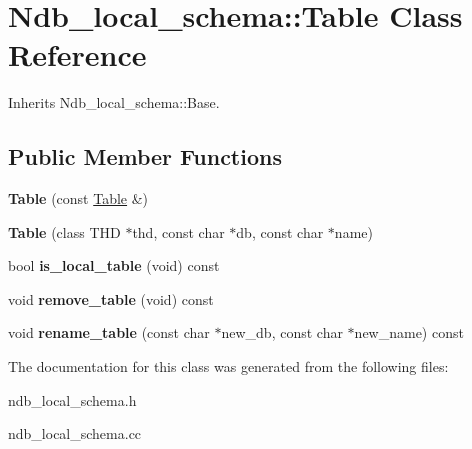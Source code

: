 \hypertarget{classNdb__local__schema_1_1Table}{}\section{Ndb\+\_\+local\+\_\+schema\+:\+:Table Class Reference}
\label{classNdb__local__schema_1_1Table}


Inherits Ndb\+\_\+local\+\_\+schema\+::\+Base.

\subsection*{Public Member Functions}
\begin{DoxyCompactItemize}
\item 
\mbox{\label{classNdb__local__schema_1_1Table_a57cbb62e132bff60d9290bac4c2e403d}} 
{\bfseries Table} (const \mbox{\hyperlink{classNdb__local__schema_1_1Table}{Table}} \&)
\item 
\mbox{\label{classNdb__local__schema_1_1Table_a57428005c221692c76feb58b849124d6}} 
{\bfseries Table} (class T\+HD $\ast$thd, const char $\ast$db, const char $\ast$name)
\item 
\mbox{\label{classNdb__local__schema_1_1Table_a6a1d059c4c5c9ac07bfca575bc557dcf}} 
bool {\bfseries is\+\_\+local\+\_\+table} (void) const
\item 
\mbox{\label{classNdb__local__schema_1_1Table_ae006041099bf9e7ea34639921956b0b7}} 
void {\bfseries remove\+\_\+table} (void) const
\item 
\mbox{\label{classNdb__local__schema_1_1Table_af3a0b9d3f24dde684ea579d07dd7cee8}} 
void {\bfseries rename\+\_\+table} (const char $\ast$new\+\_\+db, const char $\ast$new\+\_\+name) const
\end{DoxyCompactItemize}


The documentation for this class was generated from the following files\+:\begin{DoxyCompactItemize}
\item 
ndb\+\_\+local\+\_\+schema.\+h\item 
ndb\+\_\+local\+\_\+schema.\+cc\end{DoxyCompactItemize}
